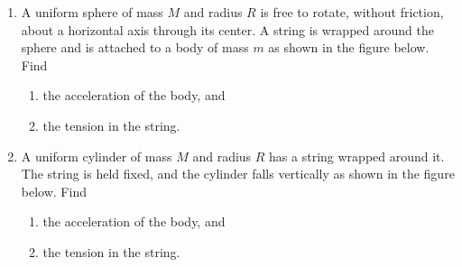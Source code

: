 \documentclass{../../oss-apphys}
\begin{document}
\begin{enumerate}[leftmargin=15pt]
\item A uniform sphere of mass $M$ and radius $R$ is free to rotate, without
  friction, about a horizontal axis through its center. A string is wrapped
  around the sphere and is attached to a body of mass $m$ as shown in the
  figure below. Find
  \begin{center}
    \vspace{-.2in}
  \end{center}
  \begin{enumerate}[itemsep=1in,leftmargin=15pt]
  \item the acceleration of the body, and
  \item the tension in the string.
  \end{enumerate}
  \vspace{1in}
\item A uniform cylinder of mass $M$ and radius $R$ has a string wrapped around
  it. The string is held fixed, and the cylinder falls vertically as shown in
  the figure below. Find
  \begin{center}
    \vspace{-.3in}
  \end{center}
  \begin{enumerate}[itemsep=1in,leftmargin=15pt]
  \item\vspace{-.3in} the acceleration of the body, and
  \item the tension in the string.
  \end{enumerate}
  

\end{enumerate}
\end{document}
